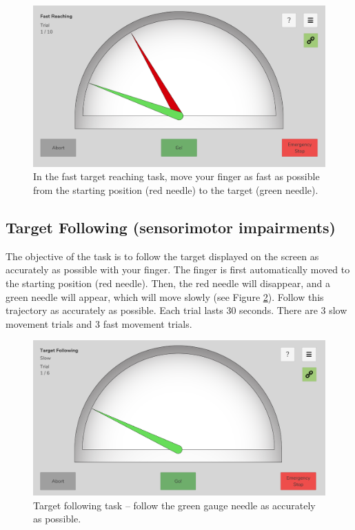 \documentclass[10pt,oneside,a4paper]{article}
\begin{document}
\begin{figure}[h!]
\begin{center}
\includegraphics[width=\columnwidth]{images/Assessments/FastReaching.png}
\caption{In the fast target reaching task, move your finger as fast as possible from the starting position (red needle) to the target (green needle).}
\label{fig:FastReaching}
\end{center}
\end{figure}

\subsection{Target Following (sensorimotor impairments)}
The objective of the task is to follow the target displayed on the screen as accurately as possible with your finger. The finger is first automatically moved to the starting position (red needle). Then, the red needle will disappear, and a green needle will appear, which will move slowly (see Figure \ref{fig:TargetFollowing}). Follow this trajectory as accurately as possible. Each trial lasts 30 seconds. There are 3 slow movement trials and 3 fast movement trials. 

\begin{figure}[h!]
\begin{center}
\includegraphics[width=\columnwidth]{images/Assessments/TargetFollowing.png}
\caption{Target following task – follow the green gauge needle as accurately as possible.}
\label{fig:TargetFollowing}
\end{center}
\end{figure}
\end{document}
